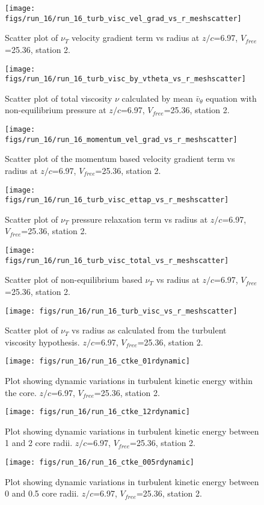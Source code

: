 \begin{figure}[H]
\centering
\texttt{[image: figs/run\_16/run\_16\_turb\_visc\_vel\_grad\_vs\_r\_meshscatter]}
\caption{Scatter plot of $\nu_T$ velocity gradient term vs radius at $z/c$=6.97, $V_{free}$=25.36, station 2.}
\end{figure}


\begin{figure}[H]
\centering
\texttt{[image: figs/run\_16/run\_16\_turb\_visc\_by\_vtheta\_vs\_r\_meshscatter]}
\caption{Scatter plot of total viscosity $\nu$ calculated by mean $\bar{v}_{\theta}$ equation with non-equilibrium pressure at $z/c$=6.97, $V_{free}$=25.36, station 2.}
\end{figure}


\begin{figure}[H]
\centering
\texttt{[image: figs/run\_16/run\_16\_momentum\_vel\_grad\_vs\_r\_meshscatter]}
\caption{Scatter plot of the momentum based velocity gradient term vs radius at $z/c$=6.97, $V_{free}$=25.36, station 2.}
\end{figure}


\begin{figure}[H]
\centering
\texttt{[image: figs/run\_16/run\_16\_turb\_visc\_ettap\_vs\_r\_meshscatter]}
\caption{Scatter plot of $\nu_T$ pressure relaxation term vs radius at $z/c$=6.97, $V_{free}$=25.36, station 2.}
\end{figure}


\begin{figure}[H]
\centering
\texttt{[image: figs/run\_16/run\_16\_turb\_visc\_total\_vs\_r\_meshscatter]}
\caption{Scatter plot of non-equilibrium based $\nu_T$ vs radius at $z/c$=6.97, $V_{free}$=25.36, station 2.}
\end{figure}


\begin{figure}[H]
\centering
\texttt{[image: figs/run\_16/run\_16\_turb\_visc\_vs\_r\_meshscatter]}
\caption{Scatter plot of $\nu_T$ vs radius as calculated from the turbulent viscosity hypothesis. $z/c$=6.97, $V_{free}$=25.36, station 2.}
\end{figure}


\begin{figure}[H]
\centering
\texttt{[image: figs/run\_16/run\_16\_ctke\_01rdynamic]}
\caption{Plot showing dynamic variations in turbulent kinetic energy within the core. $z/c$=6.97, $V_{free}$=25.36, station 2.}
\end{figure}


\begin{figure}[H]
\centering
\texttt{[image: figs/run\_16/run\_16\_ctke\_12rdynamic]}
\caption{Plot showing dynamic variations in turbulent kinetic energy between 1 and 2 core radii. $z/c$=6.97, $V_{free}$=25.36, station 2.}
\end{figure}


\begin{figure}[H]
\centering
\texttt{[image: figs/run\_16/run\_16\_ctke\_005rdynamic]}
\caption{Plot showing dynamic variations in turbulent kinetic energy between 0 and 0.5 core radii. $z/c$=6.97, $V_{free}$=25.36, station 2.}
\end{figure}


